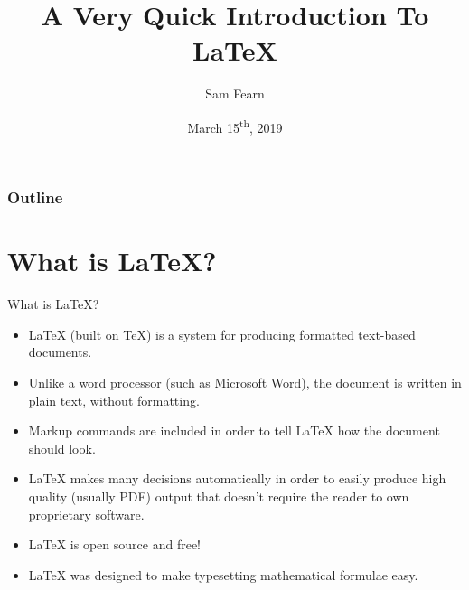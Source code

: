 \documentclass{beamer}
\author{Sam Fearn}
\title{A Very Quick Introduction To \LaTeX{}}
\date{March 15\textsuperscript{th}, 2019}
\begin{document}
    


{

\begin{frame}[plain]
\maketitle
\end{frame}
}

\begin{frame}
       \frametitle{Outline}
       \tableofcontents
\end{frame}

\section{What is \LaTeX{}?}
\label{sec:introduction}
\begin{frame}{What is \LaTeX{}?}
	\begin{itemize}
		\item<1-> \LaTeX{} (built on \TeX{}) is a system for producing formatted text-based documents.
		\item <2-> Unlike a word processor (such as Microsoft Word), the document is written in plain text, without formatting.
		\item <3-> Markup commands are included in order to tell \LaTeX{} how the document should look.
		\item <4-> \LaTeX{} makes many decisions automatically in order to easily produce high quality (usually PDF) output that doesn't require the reader to own proprietary software.
		\item <5-> \LaTeX{} is open source and free!
		\item <6-> \LaTeX{} was designed to make typesetting mathematical formulae easy.
	\end{itemize}
\end{frame}
\end{document}

